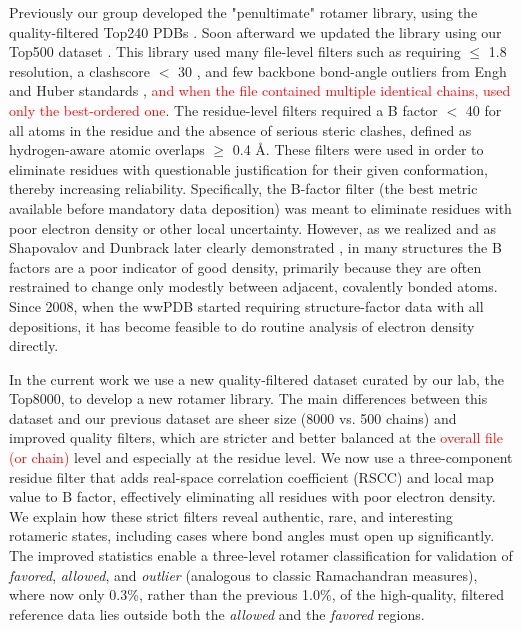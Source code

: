 Previously our group developed the "penultimate" rotamer library, using the quality-filtered Top240 PDBs \cite{lovell2000penultimate}. Soon afterward we updated the library using our Top500 dataset \cite{Lovell:2003uq}. This library used many file-level filters such as requiring $\le$ 1.8 resolution, a clashscore $<$ 30 \cite{Word1999}, and few backbone bond-angle outliers from Engh and Huber standards \cite{Engh1991}, \textcolor{red}{and when the file contained multiple identical chains, used only the best-ordered one}. The residue-level filters required a B factor $<$ 40 for all atoms in the residue and the absence of serious steric clashes, defined as hydrogen-aware atomic overlaps $\ge$ 0.4 \AA \cite{Word1999}. These filters were used in order to eliminate residues with questionable justification for their given conformation, thereby increasing reliability. Specifically, the B-factor filter (the best metric available before mandatory data deposition) was meant to eliminate residues with poor electron density or other local uncertainty. However, as we realized and as Shapovalov and Dunbrack later clearly demonstrated \cite{Shapovalov:2007}, in many structures the B factors are a poor indicator of good density, primarily because they are often restrained to change only modestly between adjacent, covalently bonded atoms. Since 2008, when the wwPDB started requiring structure-factor data with all depositions, it has become feasible to do routine analysis of electron density directly.

In the current work we use a new quality-filtered dataset curated by our lab, the Top8000, to develop a new rotamer library. The main differences between this dataset and our previous dataset are sheer size (8000 vs. 500 chains) and improved quality filters, which are stricter and better balanced at the \textcolor{red}{overall file (or chain)} level and especially at the residue level. We now use a three-component residue filter that adds real-space correlation coefficient (RSCC) and local map value to B factor, effectively eliminating all residues with poor electron density. We explain how these strict filters reveal authentic, rare, and interesting rotameric states, including cases where bond angles must open up significantly. The improved statistics enable a three-level rotamer classification for validation of \textit{favored}, \textit{allowed}, and \textit{outlier} (analogous to classic Ramachandran measures), where now only 0.3\%, rather than the previous 1.0\%, of the high-quality, filtered reference data lies outside both the \textit{allowed} and the \textit{favored} regions.

